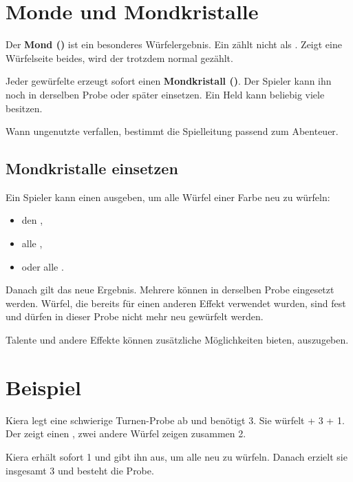 \section{Monde und Mondkristalle}

Der \textbf{Mond (\moon)} ist ein besonderes Würfelergebnis. Ein \moon{} zählt nicht als \star. Zeigt eine Würfelseite beides, wird der \star{} trotzdem normal gezählt.

Jeder gewürfelte \moon{} erzeugt sofort einen \textbf{Mondkristall (\crystal)}. Der Spieler kann ihn noch in derselben Probe oder später einsetzen. Ein Held kann beliebig viele \crystal{} besitzen.

Wann ungenutzte \crystal{} verfallen, bestimmt die Spielleitung passend zum Abenteuer.

\subsection{Mondkristalle einsetzen}

Ein Spieler kann einen \crystal{} ausgeben, um alle Würfel einer Farbe neu zu würfeln:

\begin{itemize}
  \item den \heroDie,
  \item alle \greenDie,
  \item oder alle \blueDie.
\end{itemize}

Danach gilt das neue Ergebnis. Mehrere \crystal{} können in derselben Probe eingesetzt werden. Würfel, die bereits für einen anderen Effekt verwendet wurden, sind fest und dürfen in dieser Probe nicht mehr neu gewürfelt werden.

Talente und andere Effekte können zusätzliche Möglichkeiten bieten, \crystal{} auszugeben.

\section{Beispiel}

Kiera legt eine schwierige Turnen-Probe ab und benötigt 3\star. Sie würfelt \heroDie{} + 3\greenDie{} + 1\blueDie. Der \heroDie{} zeigt einen \moon, zwei andere Würfel zeigen zusammen 2\star.

Kiera erhält sofort 1\crystal{} und gibt ihn aus, um alle \greenDie{} neu zu würfeln. Danach erzielt sie insgesamt 3\star{} und besteht die Probe.